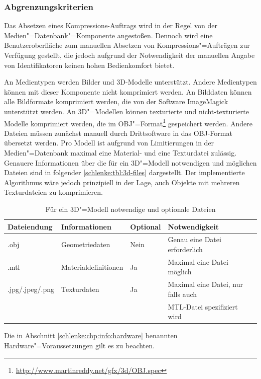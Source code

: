 \subsubsection{Abgrenzungskriterien}

Das Absetzen eines Kompressions-Auftrags wird in der Regel von der Medien"=Datenbank"=Komponente angestoßen. Dennoch wird eine Benutzeroberfläche zum manuellen Absetzen von Kompressions"=Aufträgen zur Verfügung gestellt, die jedoch aufgrund der Notwendigkeit der manuellen Angabe von Identifikatoren keinen hohen Bedienkomfort bietet.

An Medientypen werden Bilder und 3D-Modelle unterstützt. Andere Medientypen können mit dieser Komponente nicht komprimiert werden. An Bilddaten können alle Bildformate komprimiert werden, die von der Software ImageMagick unterstützt werden. An 3D"=Modellen können texturierte und nicht-texturierte Modelle komprimiert werden, die im OBJ"=Format\footnote{\url{http://www.martinreddy.net/gfx/3d/OBJ.spec}} gespeichert werden. Andere Dateien müssen zunächst manuell durch Drittsoftware in das OBJ-Format übersetzt werden. Pro Modell ist aufgrund von Limitierungen in der Medien"=Datenbank maximal eine Material- und eine Texturdatei zulässig. Genauere Informationen über die für ein 3D"=Modell notwendigen und möglichen Dateien sind in folgender \autoref{schlenke:tbl:3d-files} dargestellt. Der implementierte Algorithmus wäre jedoch prinzipiell in der Lage, auch Objekte mit mehreren Texturdateien zu komprimieren.

\begin{table}
\begin{center}
{\footnotesize
\begin{tabular}{llll}
Dateiendung & Informationen & Optional & Notwendigkeit \\
\hline
.obj & Geometriedaten & Nein & Genau eine Datei erforderlich \\
.mtl & Materialdefinitionen & Ja & Maximal eine Datei möglich \\
.jpg/.jpeg/.png & Texturdaten & Ja & Maximal eine Datei, nur falls auch \\
& & & MTL-Datei spezifiziert wird \\
\end{tabular}}
\caption{Für ein 3D"=Modell notwendige und optionale Dateien}
\label{schlenke:tbl:3d-files}
\end{center}
\end{table}

Die in Abschnitt \ref{schlenke:chp:info:hardware} benannten Hardware"=Voraussetzungen gilt es zu beachten.

